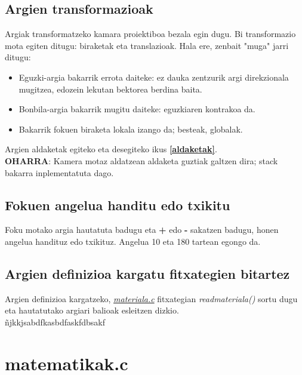 \documentclass[12pt]{article}
\newcommand{\fitxategi}[1] {\underline{\textit{#1}}}
\newcommand{\metodo}[1] {\textit{#1}}
\newcommand{\tekla}[1] {\textbf{#1}}
\newcommand{\erref}[1] {\textbf{\ref{#1}}}
\begin{document}
\subsection{Argien transformazioak}

Argiak transformatzeko kamara proiektiboa bezala egin dugu. Bi transformazio mota egiten ditugu: biraketak eta translazioak. Hala ere, zenbait "muga" jarri ditugu:

\begin{itemize}
\item Eguzki-argia bakarrik errota daiteke: ez dauka zentzurik argi direkzionala mugitzea, edozein lekutan bektorea berdina baita.

\item Bonbila-argia bakarrik mugitu daiteke: eguzkiaren kontrakoa da.

\item Bakarrik fokuen biraketa lokala izango da; besteak, globalak.
\end{itemize}

Argien aldaketak egiteko eta desegiteko ikus \erref{aldaketak}.\\

\textbf{OHARRA}: Kamera motaz aldatzean aldaketa guztiak galtzen dira; stack bakarra inplementatuta dago.

\subsection{Fokuen angelua handitu edo txikitu}

Foku motako argia hautatuta badugu eta \tekla{+} edo \tekla{-} sakatzen badugu, honen angelua handituz edo txikituz. Angelua 10 eta 180 tartean egongo da.

\subsection{Argien definizioa kargatu fitxategien bitartez}

Argien definizioa kargatzeko, \fitxategi{materiala.c} fitxategian \metodo{readmateriala()} sortu dugu eta hautatutako argiari balioak esleitzen dizkio.\\

ñjkkjsabdfkasbdfaskfdbsakf

\section{matematikak.c}\label{matematikak}
\end{document}
